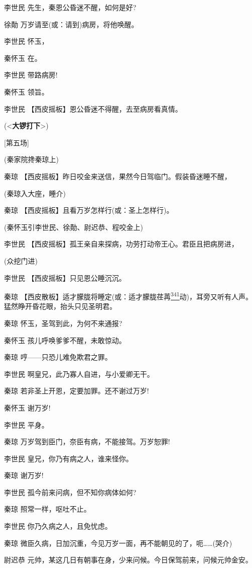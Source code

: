 李世民 先生，秦恩公昏迷不醒，如何是好?

徐勣 万岁请至(或：请到)病房，将他唤醒。

李世民 怀玉，

秦怀玉 在。

李世民 带路病房!

秦怀玉 领旨。

李世民 【西皮摇板】恩公昏迷不得醒，去至病房看真情。

(\textless{}\textbf{大锣打下}\textgreater{})

{[}第五场{]}

(秦家院搀秦琼上)

秦琼 【西皮摇板】昨日咬金来送信，果然今日驾临门。假装昏迷睡不醒，

(秦琼入大座，睡介)

秦琼 【西皮摇板】且看万岁怎样行(或：圣上怎样行)。

(秦怀玉引李世民、徐勣、尉迟恭、程咬金上)

李世民 【西皮摇板】孤王亲自来探病，功劳打动帝王心。君臣且把病房进，

(众挖门进)

李世民 【西皮摇板】只见恩公睡沉沉。

秦琼
【西皮散板】适才朦胧将睡定(或：适才朦胧荏苒\protect\hyperlink{fn341}{\textsuperscript{341}}动)，耳旁又听有人声。猛然睁开昏花眼，抬头只见圣明君。

秦琼 怀玉，圣驾到此，为何不来通报?

秦怀玉 孩儿呼唤爹爹不醒，未敢惊动。

秦琼 哼------只恐儿难免欺君之罪。

李世民 啊皇兄，此乃寡人自进，与小爱卿无干。

秦琼 若非圣上开恩，定要加罪。还不谢过万岁!

秦怀玉 谢万岁!

李世民 平身。

秦琼 万岁驾到臣门，奈臣有病，不能接驾。万岁恕罪!

李世民 皇兄，你乃有病之人，谁来怪你。

秦琼 谢万岁!

李世民 孤今前来问病，但不知你病体如何?

秦琼 照常一样，呕吐不止。

李世民 你乃久病之人，且免忧虑。

秦琼
微臣久病，日加沉重，今见万岁一面，再不能朝见的了，呃\ldots{}\ldots{}(哭介)

尉迟恭 元帅，某这几日有朝事在身，少来问候。今日保驾前来，问候元帅金安。

